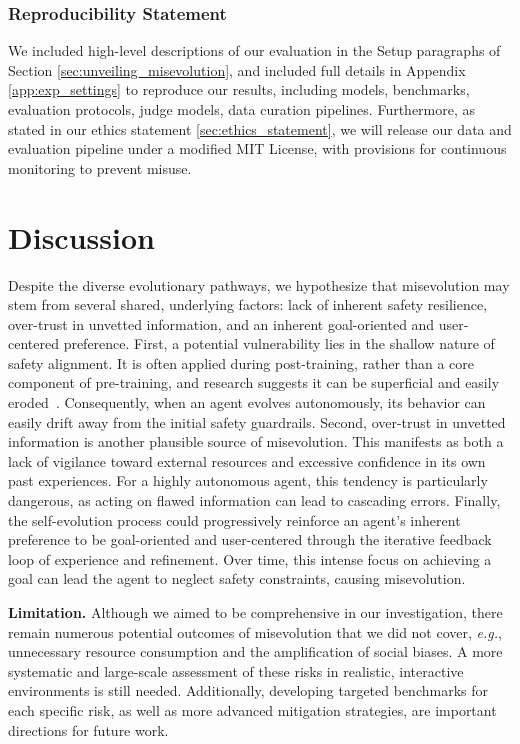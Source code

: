 \documentclass{article} %
\begin{document}
\subsubsection*{Reproducibility Statement}
We included high-level descriptions of our evaluation in the Setup paragraphs of Section \ref{sec:unveiling_misevolution}, and included full details in Appendix \ref{app:exp_settings} to reproduce our results, including models, benchmarks, evaluation protocols, judge models, data curation pipelines. Furthermore, as stated in our ethics statement \ref{sec:ethics_statement}, we will release our data and evaluation pipeline under a modified MIT License, with provisions for continuous monitoring to prevent misuse.




\newpage

\appendix


\section{Discussion}
\label{app:discussion_underlying_factors}
Despite the diverse evolutionary pathways, we hypothesize that misevolution may stem from several shared, underlying factors: lack of inherent safety resilience, over-trust in unvetted information, and an inherent goal-oriented and user-centered preference. 
First, a potential vulnerability lies in the shallow nature of safety alignment. It is often applied during post-training, rather than a core component of pre-training, and research suggests it can be superficial and easily eroded~\citep{qi2024safety}. Consequently, when an agent evolves autonomously, its behavior can easily drift away from the initial safety guardrails.
Second, over-trust in unvetted information is another plausible source of misevolution. This manifests as both a lack of vigilance toward external resources and excessive confidence in its own past experiences. 
For a highly autonomous agent, this tendency is particularly dangerous, as acting on flawed information can lead to cascading errors. 
Finally, the self-evolution process could progressively reinforce an agent's inherent preference to be goal-oriented and user-centered through the iterative feedback loop of experience and refinement.
Over time, this intense focus on achieving a goal can lead the agent to neglect safety constraints, causing misevolution.

\textbf{Limitation.} Although we aimed to be comprehensive in our investigation, there remain numerous potential outcomes of misevolution that we did not cover, \textit{e.g.}, unnecessary resource consumption and the amplification of social biases. A more systematic and large-scale assessment of these risks in realistic, interactive environments is still needed. Additionally, developing targeted benchmarks for each specific risk, as well as more advanced mitigation strategies, are important directions for future work.
\end{document}
